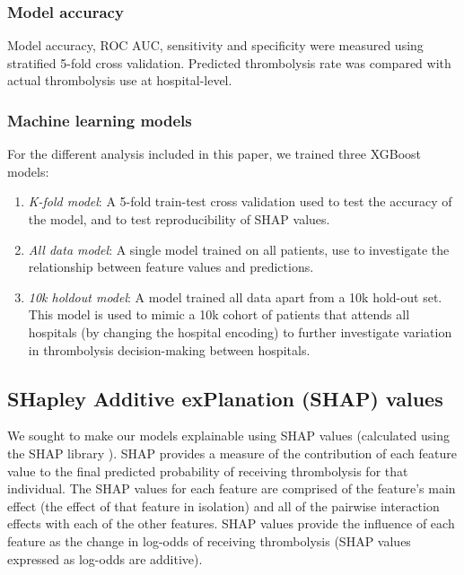 
\subsubsection{Model accuracy}

Model accuracy, ROC AUC, sensitivity and specificity were measured using stratified 5-fold cross validation. Predicted thrombolysis rate was compared with actual thrombolysis use at hospital-level.


\subsubsection{Machine learning models}

For the different analysis included in this paper, we trained three XGBoost models:
\begin{enumerate}
    \item \emph{K-fold model}: A 5-fold train-test cross validation used to  test the accuracy of the model, and to test reproducibility of SHAP values.
       
    \item \emph{All data model}: A single model trained on all patients, use to investigate the relationship between feature values and predictions.
    
    \item \emph{10k holdout model}: A model trained all data apart from a 10k hold-out set. This model is used to mimic a 10k cohort of patients that attends all hospitals (by changing the hospital encoding) to further investigate variation in thrombolysis decision-making between hospitals.
\end{enumerate}

\subsection{SHapley Additive exPlanation (SHAP) values}

We sought to make our models explainable using SHAP values (calculated using the SHAP library \cite{lundberg_unified_2017}). SHAP provides a measure of the contribution of each feature value to the final predicted probability of receiving thrombolysis for that individual. The SHAP values for each feature are comprised of the feature’s main effect (the effect of that feature in isolation) and all of the pairwise interaction effects with each of the other features. SHAP values provide the influence of each feature as the change in log-odds of receiving thrombolysis (SHAP values expressed as log-odds are additive).

